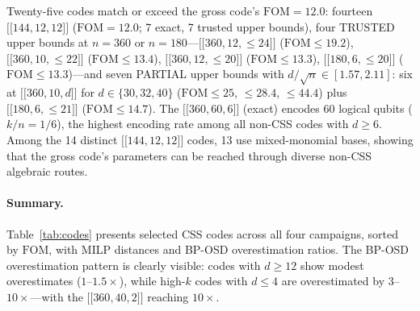 \documentclass[aps,prxquantum,twocolumn,superscriptaddress,nofootinbib]{revtex4-2}
\newcommand{\dblbrk}[1]{\ensuremath{\lbrack\!\lbrack #1 \rbrack\!\rbrack}}
\newcommand{\code}[1]{\dblbrk{#1}}
\newcommand{\FOM}{\ensuremath{\mathrm{FOM}}}
\begin{document}
Twenty-five codes match or exceed the gross code's $\FOM = 12.0$: fourteen $\code{144,12,12}$ ($\FOM = 12.0$; 7 exact, 7 trusted upper bounds), four TRUSTED upper bounds at $n = 360$ or $n = 180$---$\code{360,12,{\leq}24}$ ($\FOM \leq 19.2$), $\code{360,10,{\leq}22}$ ($\FOM \leq 13.4$), $\code{360,12,{\leq}20}$ ($\FOM \leq 13.3$), $\code{180,6,{\leq}20}$ ($\FOM \leq 13.3$)---and seven PARTIAL upper bounds with $d/\sqrt{n} \in [1.57, 2.11]$: six at $\code{360,10,d}$ for $d \in \{30, 32, 40\}$ ($\FOM \leq 25$, $\leq 28.4$, $\leq 44.4$) plus $\code{180,6,{\leq}21}$ ($\FOM \leq 14.7$).
The $\code{360,60,6}$ (exact) encodes 60 logical qubits ($k/n = 1/6$), the highest encoding rate among all non-CSS codes with $d \geq 6$.
Among the 14 distinct $\code{144,12,12}$ codes, 13 use mixed-monomial bases, showing that the gross code's parameters can be reached through diverse non-CSS algebraic routes.

\paragraph{Summary.}
Table~\ref{tab:codes} presents selected CSS codes across all four campaigns, sorted by $\FOM$, with MILP distances and BP-OSD overestimation ratios. 
The BP-OSD overestimation pattern is clearly visible: codes with $d \geq 12$ show modest overestimates ($1$--$1.5\times$), while high-$k$ codes with $d \leq 4$ are overestimated by $3$--$10\times$---with the $\code{360,40,2}$ reaching $10\times$.
\end{document}
